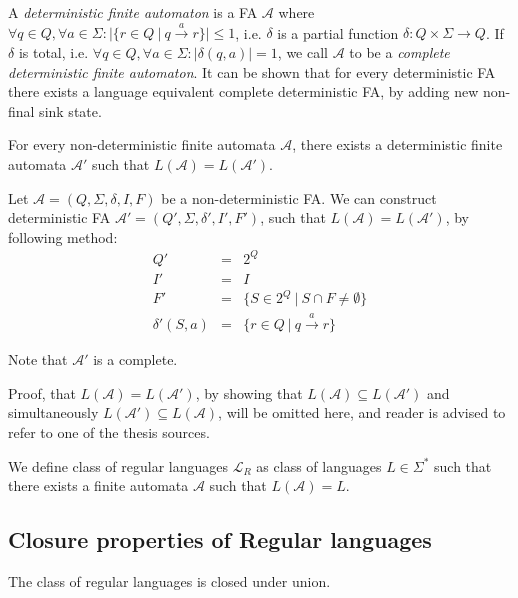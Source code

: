 	A \emph{deterministic finite automaton} is a FA $\mathcal{A}$ where $\forall q \in Q, \forall a \in \Sigma: |\{ r \in Q\ |\ q \overset{a}{\longrightarrow} r\}| \leq 1$, i.e. $\delta$ is a partial function $\delta : Q \times \Sigma \longrightarrow Q$. If $\delta$ is total, i.e. $\forall q \in Q, \forall a \in \Sigma : |\delta(q, a)| = 1$, we call $\mathcal{A}$ to be a \emph{complete deterministic finite automaton}. It can be shown that for every deterministic FA there exists a language equivalent complete deterministic FA, by adding new non-final sink state.
	
	\begin{lemma}
	 For every non-deterministic finite automata $\mathcal{A}$, there exists a deterministic finite automata $\mathcal{A}'$ such that $L(\mathcal{A}) = L(\mathcal{A}')$.
	\end{lemma}
	
	Let $\mathcal{A} = (Q, \Sigma, \delta, I, F)$ be a non-deterministic FA. We can construct deterministic FA $\mathcal{A}'= (Q', \Sigma, \delta', I', F')$, such that $L(\mathcal{A}) = L(\mathcal{A}')$, by following method:
	\begin{eqnarray*}
	 Q' & = & 2^Q\\
	 I' & = & I\\
	 F' & = & \{S \in 2^Q\ |\ S \cap F \neq \emptyset\}\\
	 \delta'(S, a) & = & \{r \in Q\ |\ q \overset{a}{\longrightarrow} r\}
	\end{eqnarray*}
	
	Note that $\mathcal{A}'$ is a complete.
	
	Proof, that $L(\mathcal{A}) = L(\mathcal{A}')$, by showing that $L(\mathcal{A}) \subseteq L(\mathcal{A}')$ and simultaneously $L(\mathcal{A}') \subseteq L(\mathcal{A})$, will be omitted here, and reader is advised to refer to one of the thesis sources.
	
	\begin{defz}
	 We define class of regular languages $\mathcal{L}_R$ as class of languages $L \in \Sigma^*$ such that there exists a finite automata $\mathcal{A}$ such that $L(\mathcal{A}) = L$.
	\end{defz}
	
 \subsection{Closure properties of Regular languages}

\begin{theorem}
 The class of regular languages is closed under union.
\end{theorem}

